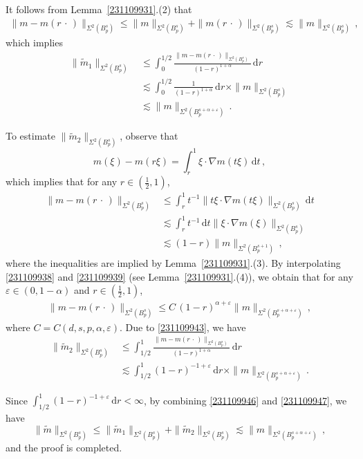 \documentclass[11pt]{amsart}
\theoremstyle{plain}
\theoremstyle{definition}
\theoremstyle{remark}
\numberwithin{equation}{section}
\newcommand{\dd}{\,\mathrm{d}}
\newcommand{\wt}{\widetilde}
\begin{document}
It follows from Lemma~\ref{231109931}.(2) that
\begin{align}\label{231109939}
\|m-m(r\,\cdot\,)\|_{\Sigma^2(B_p^s)}\leq \|m\|_{\Sigma^2(B_p^s)}+\|m(r\,\cdot\,)\|_{\Sigma^2(B_p^s)}\lesssim \|m\|_{\Sigma^2(B_p^s)}\,,
\end{align}
which implies 
\begin{align}
\|\wt{m}_1\|_{\Sigma^2(B_p^s)}\,&\leq \int_0^{1/2}\frac{\|m-m(r\,\cdot\,)\|_{\Sigma^2(B_p^s)}}{(1-r)^{1+\alpha}}\dd r\nonumber\\
&\lesssim \int_0^{1/2}\frac{1}{(1-r)^{1+\alpha}}\dd r\times \|m\|_{\Sigma^2(B_p^s)}\label{231109947}\\
&\lesssim\|m\|_{\Sigma^2(B_p^{s+\alpha+\varepsilon})}\,.\nonumber
\end{align}

To estimate $\|\wt{m}_2\|_{\Sigma^2(B_p^s)}$, observe that
$$
m(\xi)-m(r\xi)=\int_r^1\xi\cdot\nabla m(t\xi)\dd t\,,
$$
which implies that for any $r\in\left(\frac{1}{2},1\right)$,
\begin{align}
\|m-m(r\,\cdot\,)\|_{\Sigma^2(B_p^s)}&\leq \int_r^1 t^{-1}\|t\xi\cdot \nabla m(t\xi)\|_{\Sigma^2(B_p^s)}\dd t\nonumber\\
&\lesssim \int_r^1 t^{-1}\dd t\|\xi\cdot \nabla m(\xi)\|_{\Sigma^2(B_p^s)}\label{231109938}\\
&\lesssim (1-r)\|m\|_{\Sigma^2(B_p^{s+1})}\,,\nonumber
\end{align}
where the inequalities are implied by Lemma~\ref{231109931}.(3).
By interpolating \eqref{231109938} and \eqref{231109939} (see Lemma~\ref{231109931}.(4)), we obtain that for any $\varepsilon\in(0,1-\alpha)$ and $r\in\left(\frac{1}{2},1\right)$, 
\begin{align}\label{231109943}
\|m-m(r\,\cdot\,)\|_{\Sigma^2(B_p^s)}\leq  C\, (1-r)^{\alpha+\varepsilon}\|m\|_{\Sigma^2(B_p^{s+\alpha+\varepsilon})}\,,
\end{align}
where $C=C(d,s,p,\alpha,\varepsilon)$.
Due to \eqref{231109943}, we have
\begin{equation}\label{231109946}
\begin{aligned}
\|\wt{m}_2\|_{\Sigma^2(B_p^s)}&\leq \int_{1/2}^1\frac{\|m-m(r\,\cdot\,)\|_{\Sigma^2(B_p^s)}}{(1-r)^{1+\alpha}}\dd r\\
&\lesssim \int_{1/2}^{1}(1-r)^{-1+\varepsilon}\dd r\times \|m\|_{\Sigma^2(B_p^{s+\alpha+\varepsilon})}\,.
\end{aligned}
\end{equation}

Since $\int_{1/2}^1(1-r)^{-1+\varepsilon}\dd r<\infty$, by combining \eqref{231109946} and \eqref{231109947}, we have
$$
\|\wt{m}\|_{\Sigma^2(B_p^s)}\leq \|\wt{m}_1\|_{\Sigma^2(B_p^s)}+\|\wt{m}_2\|_{\Sigma^2(B_p^s)}\lesssim \|m\|_{\Sigma^2(B_p^{s+\alpha+\varepsilon})}\,,
$$
and the proof is completed.
\end{document}
